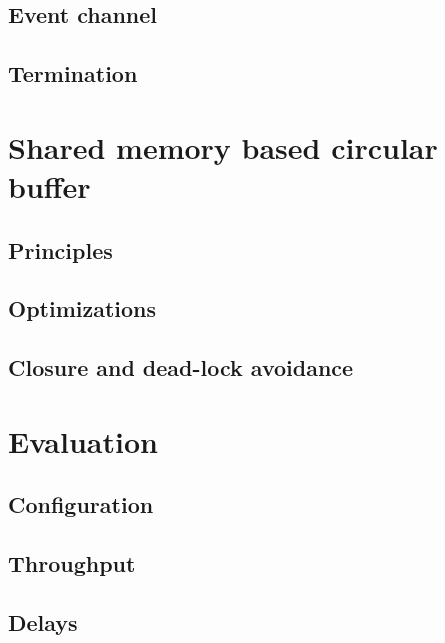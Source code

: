 \documentclass[journal]{IEEEtran}
\begin{document}
\subsection{Event channel}



\subsection{Termination}
\label{Termination}








\section{Shared memory based circular buffer}

\subsection{Principles}



\subsection{Optimizations}



\subsection{Closure and dead-lock avoidance}






\section{Evaluation}


\subsection{Configuration}

\subsection{Throughput}





\subsection{Delays}
\end{document}

